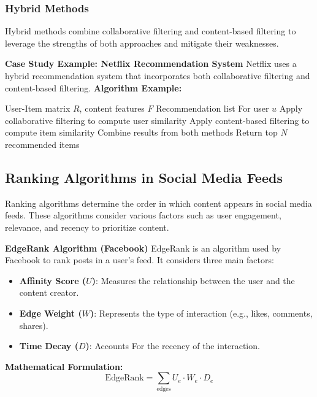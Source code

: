 \documentclass[12pt]{book} %
\begin{document}
\subsubsection*{Hybrid Methods}
Hybrid methods combine collaborative filtering and content-based filtering to leverage the strengths of both approaches and mitigate their weaknesses.

\textbf{Case Study Example: Netflix Recommendation System}
Netflix uses a hybrid recommendation system that incorporates both collaborative filtering and content-based filtering.
\FloatBarrier
\textbf{Algorithm Example:}
\begin{algorithm}[H]
\caption{Netflix Hybrid Recommendation Algorithm}
\begin{algorithmic}[1]
\Require User-Item matrix $R$, content features $F$
\Ensure Recommendation list For user $u$
\State Apply collaborative filtering to compute user similarity
\State Apply content-based filtering to compute item similarity
\State Combine results from both methods
\State Return top $N$ recommended items
\end{algorithmic}
\end{algorithm}
\FloatBarrier
\subsection{Ranking Algorithms in Social Media Feeds}
Ranking algorithms determine the order in which content appears in social media feeds. These algorithms consider various factors such as user engagement, relevance, and recency to prioritize content.

\textbf{EdgeRank Algorithm (Facebook)}
EdgeRank is an algorithm used by Facebook to rank posts in a user's feed. It considers three main factors:
\begin{itemize}
    \item \textbf{Affinity Score ($U$)}: Measures the relationship between the user and the content creator.
    \item \textbf{Edge Weight ($W$)}: Represents the type of interaction (e.g., likes, comments, shares).
    \item \textbf{Time Decay ($D$)}: Accounts For the recency of the interaction.
\end{itemize}

\textbf{Mathematical Formulation:}
\begin{equation}
\text{EdgeRank} = \sum_{\text{edges}} U_e \cdot W_e \cdot D_e
\end{equation}
\end{document}
